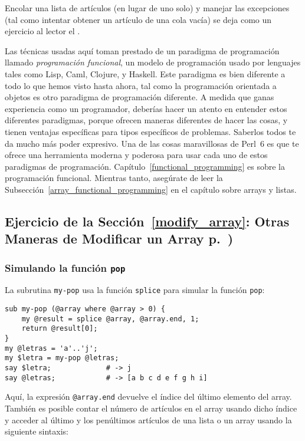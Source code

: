 Encolar una lista de artículos (en lugar de uno solo) 
y manejar las excepciones (tal como
intentar obtener un artículo de una cola vacía) se deja 
como un ejercicio al lector el .

Las técnicas usadas aquí toman prestado de un paradigma de 
programación llamado \emph{programación funcional}, un
modelo de programación usado por lenguajes tales como Lisp,
Caml, Clojure, y Haskell. Este paradigma es bien diferente
a todo lo que hemos visto hasta ahora, tal como la programación
orientada a objetos es otro paradigma de programación diferente.
A medida que ganas experiencia como un programador, deberías
hacer un atento en entender estos diferentes paradigmas, porque
ofrecen maneras diferentes de hacer las cosas, y tienen ventajas 
específicas para tipos específicos de problemas. Saberlos todos
te da mucho más poder expresivo. Una de las cosas maravillosas de
Perl~6 es que te ofrece una herramienta moderna y poderosa 
para usar cada uno de estos paradigmas de programación.
Capítulo~\ref{functional_programming} es sobre la programación
funcional. Mientras tanto, asegúrate de leer la Subsección~\ref{array_functional_programming}
en el capítulo sobre arrays y listas.

\subsection{Ejercicio de la Sección~\ref{modify_array}: Otras Maneras de Modificar un Array p.~\pageref{splice_exercise})}
\label{sol_splice_exercise}

\subsubsection{Simulando la función {\tt pop}}

La subrutina {\tt my-pop} usa la función {\tt splice} para
simular la función {\tt pop}: 

\begin{verbatim}
sub my-pop (@array where @array > 0) {
    my @result = splice @array, @array.end, 1;
    return @result[0];
}
my @letras = 'a'..'j';
my $letra = my-pop @letras;
say $letra;             # -> j
say @letras;            # -> [a b c d e f g h i]
\end{verbatim}

Aquí, la expresión \verb|@array.end| devuelve el índice del
último elemento del array. También es posible contar el número
de artículos en el array usando dicho índice y acceder al último
y los penúltimos artículos de una lista o un array usando la
siguiente sintaxis:

